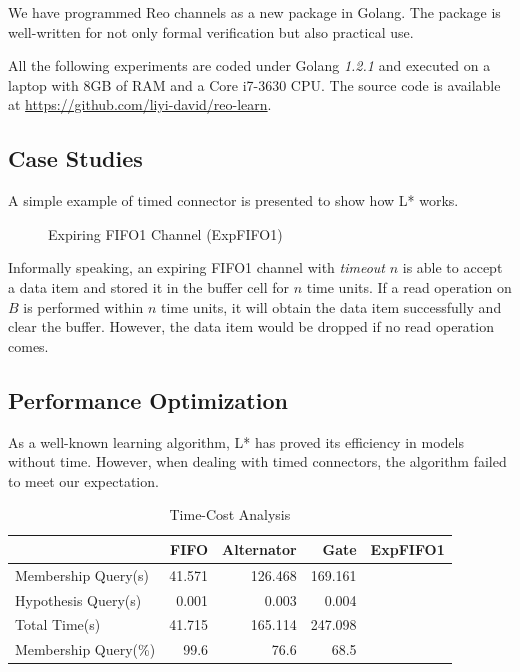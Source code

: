 \documentclass[conference, a4paper]{IEEEtran}
\begin{document}
We have programmed Reo channels as a new package in Golang. The package is well-written for not only
formal verification but also practical use.

All the following experiments are coded under Golang \emph{1.2.1} and executed on a laptop with 8GB
of RAM and a Core i7-3630 CPU. The source code is available at
\url{https://github.com/liyi-david/reo-learn}.

\subsection{Case Studies}
A simple example of timed connector is presented to show how L* works.
\begin{figure}[h]
  \begin{center}
    
  \end{center}
  \caption{Expiring FIFO1 Channel (ExpFIFO1)}
  \label{fig:expfifo}
\end{figure}

Informally speaking, an expiring FIFO1 channel with \emph{timeout} $n$ is able to accept a data item
and stored it in the buffer cell for $n$ time units. If a read operation on $B$ is performed within
$n$ time units, it will obtain the data item successfully and clear the buffer. However, the data
item would be dropped if no read operation comes.

\subsection{Performance Optimization}
As a well-known learning algorithm, L* has proved its efficiency in models without time.
However, when dealing with timed connectors, the algorithm failed to meet our expectation.

\begin{table}[h]
  \renewcommand{\arraystretch}{1.3}
  \caption{Time-Cost Analysis}
  \label{tabel:timecost}
  \centering
  \begin{tabular}{l||rrrr}
    \hline
    & FIFO & Alternator & Gate & ExpFIFO1\\
    \hline\hline
    Membership Query(s) & 41.571 & 126.468 & 169.161 &\\
    Hypothesis Query(s) & 0.001 & 0.003 & 0.004 &\\
    Total Time(s) & 41.715 & 165.114 & 247.098 &\\
    Membership Query(\%) & 99.6 & 76.6 & 68.5 &\\
    \hline
  \end{tabular}
\end{table}
\end{document}
